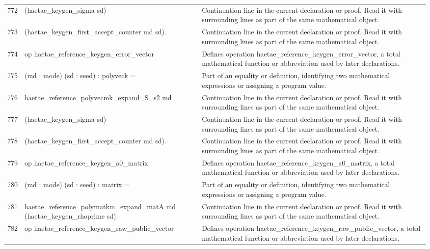 \documentclass[10pt]{article}
\begin{document}
\begin{longtable}{r L{0.53\textwidth} L{0.37\textwidth}}
772 & {\ttfamily\scriptsize     (haetae\_keygen\_sigma sd)} & Continuation line in the current declaration or proof.  Read it with surrounding lines as part of the same mathematical object. \\
773 & {\ttfamily\scriptsize     (haetae\_keygen\_first\_accept\_counter md sd).} & Continuation line in the current declaration or proof.  Read it with surrounding lines as part of the same mathematical object. \\
774 & {\ttfamily\scriptsize op haetae\_reference\_keygen\_error\_vector} & Defines operation haetae\_reference\_keygen\_error\_vector, a total mathematical function or abbreviation used by later declarations. \\
775 & {\ttfamily\scriptsize    (md : mode) (sd : seed) : polyveck =} & Part of an equality or definition, identifying two mathematical expressions or assigning a program value. \\
776 & {\ttfamily\scriptsize   haetae\_reference\_polyvecmk\_expand\_S\_s2 md} & Continuation line in the current declaration or proof.  Read it with surrounding lines as part of the same mathematical object. \\
777 & {\ttfamily\scriptsize     (haetae\_keygen\_sigma sd)} & Continuation line in the current declaration or proof.  Read it with surrounding lines as part of the same mathematical object. \\
778 & {\ttfamily\scriptsize     (haetae\_keygen\_first\_accept\_counter md sd).} & Continuation line in the current declaration or proof.  Read it with surrounding lines as part of the same mathematical object. \\
779 & {\ttfamily\scriptsize op haetae\_reference\_keygen\_a0\_matrix} & Defines operation haetae\_reference\_keygen\_a0\_matrix, a total mathematical function or abbreviation used by later declarations. \\
780 & {\ttfamily\scriptsize    (md : mode) (sd : seed) : matrix =} & Part of an equality or definition, identifying two mathematical expressions or assigning a program value. \\
781 & {\ttfamily\scriptsize   haetae\_reference\_polymatkm\_expand\_matA md (haetae\_keygen\_rhoprime sd).} & Continuation line in the current declaration or proof.  Read it with surrounding lines as part of the same mathematical object. \\
782 & {\ttfamily\scriptsize op haetae\_reference\_keygen\_raw\_public\_vector} & Defines operation haetae\_reference\_keygen\_raw\_public\_vector, a total mathematical function or abbreviation used by later declarations. \\

\end{longtable}
\end{document}
